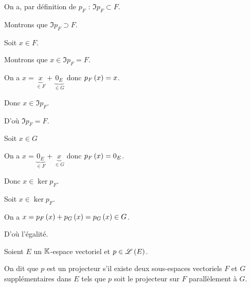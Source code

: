 \begin{dem}[\(\Im p_F\)]
On a, par définition de \(p_F\) : \(\Im p_F\subset F\).

Montrons que \(\Im p_F\supset F\).

Soit \(x\in F\).

Montrons que \(x\in\Im p_F=F\).

On a \(x=\underbrace{x}_{\in F}+\underbrace{0_E}_{\in G}\) donc \(p_F\left(x\right)=x\).

Donc \(x\in\Im p_F\).

D'où \(\Im p_F=F\).
\end{dem}

\begin{dem}[\(\ker p_F=G\)]
\increc

Soit \(x\in G\)

On a \(x=\underbrace{0_E}_{\in F}+\underbrace{x}_{\in G}\) donc \(p_F\left(x\right)=0_E\).

Donc \(x\in\ker p_F\).

\incdir

Soit \(x\in\ker p_F\).

On a \(x=p_F\left(x\right)+p_G\left(x\right)=p_G\left(x\right)\in G\).

D'où l'égalité.
\end{dem}

\begin{defi}
Soient \(E\) un \(\mathbb{K}\)-espace vectoriel et \(p\in\mathscr{L}\left(E\right)\).

On dit que \(p\) est un projecteur s'il existe deux sous-espaces vectoriels \(F\) et \(G\) supplémentaires dans \(E\) tels que \(p\) soit le projecteur sur \(F\) parallèlement à \(G\).
\end{defi}

